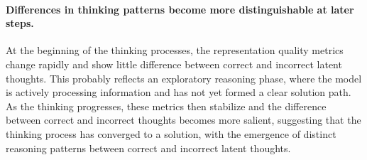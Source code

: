 \documentclass{article} %
\begin{document}
\paragraph*{Differences in thinking patterns become more distinguishable at later steps.}
At the beginning of the thinking processes, the representation quality metrics change rapidly and show little difference between correct and incorrect latent thoughts.
%
This probably reflects an exploratory reasoning phase, where the model is actively processing information and has not yet formed a clear solution path. 
%
As the thinking progresses, these metrics then stabilize and the difference between correct and incorrect thoughts becomes more salient, suggesting that the thinking process has converged to a solution, with the emergence of distinct reasoning patterns between correct and incorrect latent thoughts.
%


\end{document}
